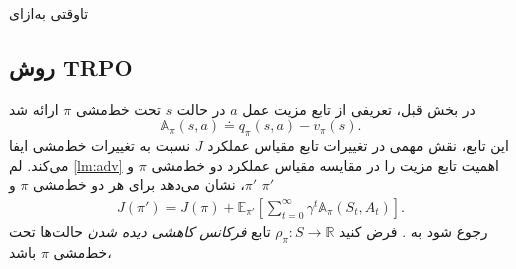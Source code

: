 

‌تاوقتی
‌به‌ازای
\subsection{روش TRPO}
در بخش قبل، تعریفی از تابع مزیت عمل $a$ در حالت $s$ تحت خط‌مشی 
$\pi$
ارائه شد
$$\mathbb{A}_\pi(s,a) \doteq q_\pi(s,a) - v_\pi(s).$$
این تابع، نقش مهمی در تغییرات تابع مقیاس عملکرد $J$ نسبت به تغییرات خط‌مشی ایفا می‌کند. لم 
\ref{lm:adv}
اهمیت تابع مزیت را در مقایسه مقیاس عملکرد دو خط‌مشی $\pi$ و $\pi'$، نشان می‌دهد
برای هر دو خط‌مشی $\pi$ و $\pi'$
\begin{align}
J(\pi') = J(\pi) + \mathbb{E}_{\pi'}\left[\sum_{t=0}^{\infty} \gamma^t \mathbb{A}_\pi(S_t, A_t)\right].
\label{eq:adv}
\end{align}
\label{lm:adv}
رجوع شود به 
\cite{degris2012off}.
فرض کنید
$\rho_\pi : S \longrightarrow \mathbb{R}$
تابع 
\textit{فرکانس کاهشی دیده شدن}
	 حالت‌ها تحت خط‌مشی $\pi$ باشد،

